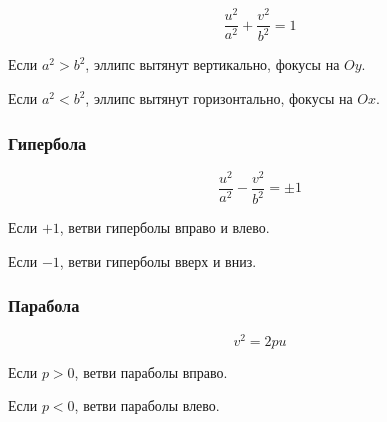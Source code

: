 \documentclass{article}
\begin{document}
\[
	\frac{u^2}{a^2} + \frac{v^2}{b^2} = 1
\]

Если $a^2 > b^2$, эллипс вытянут вертикально, фокусы на $Oy$.

Если $a^2 < b^2$, эллипс вытянут горизонтально, фокусы на $Ox$.

\subsubsection{Гипербола}

\[
	\frac{u^2}{a^2} - \frac{v^2}{b^2} = \pm 1
\]

Если $+1$, ветви гиперболы вправо и влево.

Если $-1$, ветви гиперболы вверх и вниз.

\subsubsection{Парабола}

\[
	v^2 = 2pu
\]

Если $p > 0$, ветви параболы вправо.

Если $p < 0$, ветви параболы влево.
\end{document}

